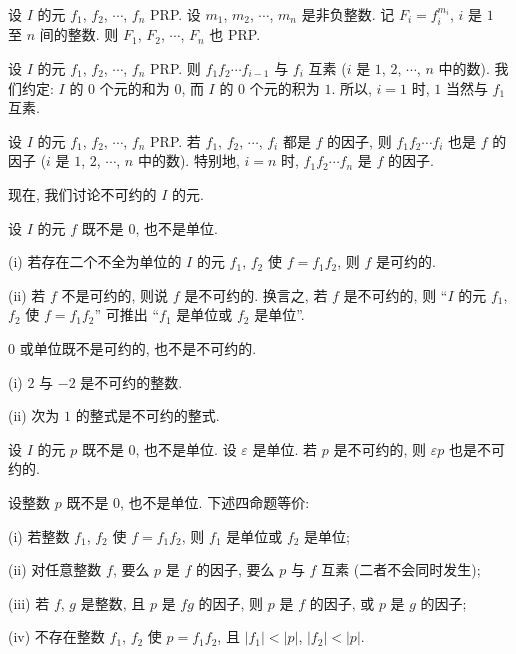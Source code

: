 \begin{proposition}
    设 $I$ 的元 $f_1$, $f_2$, $\cdots$, $f_n$ PRP. 设 $m_1$, $m_2$, $\cdots$, $m_n$ 是非负整数. 记 $F_i = f_i^{m_i}$, $i$ 是 $1$ 至 $n$ 间的整数. 则 $F_1$, $F_2$, $\cdots$, $F_n$ 也 PRP.
\end{proposition}

\begin{proposition}
    设 $I$ 的元 $f_1$, $f_2$, $\cdots$, $f_n$ PRP. 则 $f_1 f_2 \cdots f_{i-1}$ 与 $f_i$ 互素 ($i$ 是 $1$, $2$, $\cdots$, $n$ 中的数). 我们约定: $I$ 的 $0$ 个元的和为 $0$, 而 $I$ 的 $0$ 个元的积为 $1$. 所以, $i = 1$ 时, $1$ 当然与 $f_1$ 互素.
\end{proposition}

\begin{proposition}
    设 $I$ 的元 $f_1$, $f_2$, $\cdots$, $f_n$ PRP. 若 $f_1$, $f_2$, $\cdots$, $f_i$ 都是 $f$ 的因子, 则 $f_1 f_2 \cdots f_i$ 也是 $f$ 的因子 ($i$ 是 $1$, $2$, $\cdots$, $n$ 中的数). 特别地, $i = n$ 时, $f_1 f_2 \cdots f_n$ 是 $f$ 的因子.
\end{proposition}

现在, 我们讨论不可约的 $I$ 的元.

\begin{definition}
    设 $I$ 的元 $f$ 既不是 $0$, 也不是单位.

    (i) 若存在二个不全为单位的 $I$ 的元 $f_1$, $f_2$ 使 $f = f_1 f_2$, 则 $f$ 是可约的.

    (ii) 若 $f$ 不是可约的, 则说 $f$ 是不可约的. 换言之, 若 $f$ 是不可约的, 则 ``$I$ 的元 $f_1$, $f_2$ 使 $f = f_1 f_2$'' 可推出 ``$f_1$ 是单位或 $f_2$ 是单位''.
\end{definition}

\begin{remark}
    $0$ 或单位既不是可约的, 也不是不可约的.
\end{remark}

\begin{proposition}
    (i) $2$ 与 $-2$ 是不可约的整数.

    (ii) 次为 $1$ 的整式是不可约的整式.
\end{proposition}

\begin{proposition}
    设 $I$ 的元 $p$ 既不是 $0$, 也不是单位. 设 $\varepsilon$ 是单位. 若 $p$ 是不可约的, 则 $\varepsilon p$ 也是不可约的.
\end{proposition}

\begin{proposition}
    设整数 $p$ 既不是 $0$, 也不是单位. 下述四命题等价:

    (i) 若整数 $f_1$, $f_2$ 使 $f = f_1 f_2$, 则 $f_1$ 是单位或 $f_2$ 是单位;

    (ii) 对任意整数 $f$, 要么 $p$ 是 $f$ 的因子, 要么 $p$ 与 $f$ 互素 (二者不会同时发生);

    (iii) 若 $f$, $g$ 是整数, 且 $p$ 是 $fg$ 的因子, 则 $p$ 是 $f$ 的因子, 或 $p$ 是 $g$ 的因子;

    (iv) 不存在整数 $f_1$, $f_2$ 使 $p = f_1 f_2$, 且 $|f_1| < |p|$, $|f_2| < |p|$.
\end{proposition}


